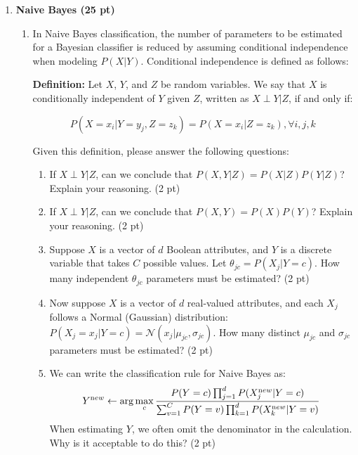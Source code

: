 \documentclass{article}
\theoremstyle{definition}
\theoremstyle{remark}
\newenvironment{Q}
        {%
          \clearpage
          \item
        }
        {%
          \phantom{s} %
          \bigskip
        }
\begin{document}
\begin{enumerate}[font={\Large\bfseries},left=0pt]
\begin{Q}
\textbf{\Large  Naive Bayes (25 pt)}

\begin{enumerate}
    
    \item  In Naive Bayes classification, the number of parameters to be estimated for a Bayesian classifier is reduced by assuming conditional independence when modeling $P(X|Y)$. Conditional independence is defined as follows:

    \textbf{Definition:} Let $X$, $Y$, and $Z$ be random variables. We say that $X$ is conditionally independent of $Y$ given $Z$, written as $X \perp Y | Z$, if and only if:


\[
P(X = x_i|Y = y_j, Z = z_k) = P(X = x_i|Z = z_k), \forall i, j, k
\]

Given this definition, please answer the following questions:
    
    \begin{enumerate}
        \item If $X \perp Y | Z$, can we conclude that 
        $P(X,Y | Z) = P(X | Z)P(Y | Z)$?
        Explain your reasoning. (2 pt)

        \item If $X \perp Y | Z$, can we conclude that 
        $P(X, Y) = P(X)P(Y)$? 
        Explain your reasoning. (2 pt)

        \item Suppose $X$ is a vector of $d$ Boolean attributes, and $Y$ is a discrete variable that takes $C$ possible values. Let $\theta_{jc} = P(X_j | Y = c)$. How many independent $\theta_{jc}$ parameters must be estimated? (2 pt)

        \item Now suppose $X$ is a vector of $d$ real-valued attributes, and each $X_j$ follows a Normal (Gaussian) distribution: $P(X_j = x_j | Y = c) = \mathcal{N}(x_j | \mu_{jc}, \sigma_{jc})$. How many distinct $\mu_{jc}$ and $\sigma_{jc}$ parameters must be estimated? (2 pt)\\

        \item We can write the classification rule for Naive Bayes as:
        \[
        Y^{\text new} \leftarrow \arg\max_c \frac{P(Y = c)\prod_{j=1}^{d} P(X_j^{\text new}|Y = c)}{\sum_{v=1}^C P(Y = v)\prod_{k=1}^{d} P(X_k^{\text new}|Y = v)}
        \] 
            When estimating $Y$, we often omit the denominator in the calculation. Why is it acceptable to do this? (2 pt)


\end{enumerate}
\end{enumerate}
\end{Q}
\end{enumerate}
\end{document}
